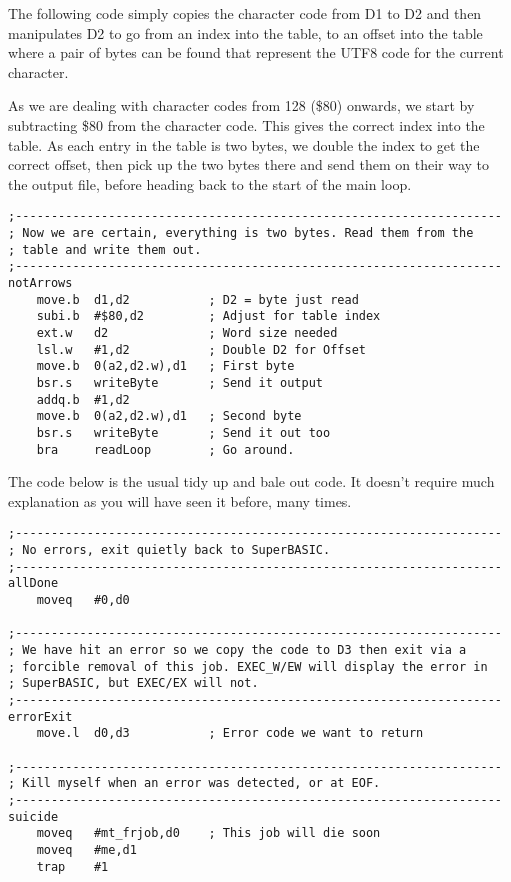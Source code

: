 The following code simply copies the character code from D1 to D2
and then manipulates D2 to go from an index into the table, to an
offset into the table where a pair of bytes can be found that represent
the UTF8 code for the current character. 

As we are dealing with character codes from 128 (\$80) onwards, we
start by subtracting \$80 from the character code. This gives the
correct index into the table. As each entry in the table is two bytes,
we double the index to get the correct offset, then pick up the two
bytes there and send them on their way to the output file, before
heading back to the start of the main loop.

\begin{lstlisting}[tabsize=4]
;--------------------------------------------------------------------
; Now we are certain, everything is two bytes. Read them from the
; table and write them out.
;--------------------------------------------------------------------
notArrows
    move.b  d1,d2           ; D2 = byte just read
    subi.b  #$80,d2         ; Adjust for table index
    ext.w   d2              ; Word size needed
    lsl.w   #1,d2           ; Double D2 for Offset
    move.b  0(a2,d2.w),d1   ; First byte
    bsr.s   writeByte       ; Send it output
    addq.b  #1,d2
    move.b  0(a2,d2.w),d1   ; Second byte
    bsr.s   writeByte       ; Send it out too
    bra     readLoop        ; Go around.
\end{lstlisting}

The code below is the usual tidy up and bale out code. It doesn't
require much explanation as you will have seen it before, many times.

\begin{lstlisting}
;--------------------------------------------------------------------
; No errors, exit quietly back to SuperBASIC.
;--------------------------------------------------------------------
allDone
    moveq   #0,d0

;--------------------------------------------------------------------
; We have hit an error so we copy the code to D3 then exit via a
; forcible removal of this job. EXEC_W/EW will display the error in
; SuperBASIC, but EXEC/EX will not.
;--------------------------------------------------------------------
errorExit
    move.l  d0,d3           ; Error code we want to return

;--------------------------------------------------------------------
; Kill myself when an error was detected, or at EOF.
;--------------------------------------------------------------------
suicide
    moveq   #mt_frjob,d0    ; This job will die soon
    moveq   #me,d1
    trap    #1
\end{lstlisting}


